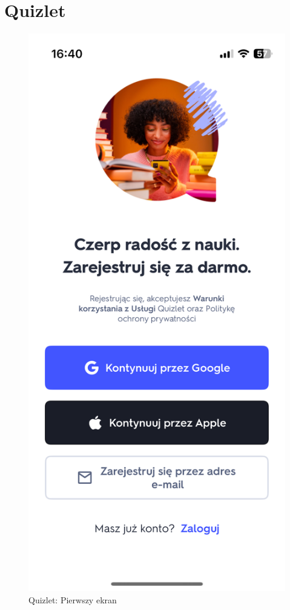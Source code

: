 \documentclass[final,a4paper,openany,12pt]{mwbk}
\begin{document}
\section{Quizlet} 

\begin{figure}[H]
\centering
\begin{minipage}{0.5\textwidth}
  \centering
\includegraphics[width=.75\linewidth]{img/quizlet1.PNG}
  \caption{Quizlet: Pierwszy ekran}
  \label{fig:quizlet1}
\end{minipage}%
\begin{minipage}{0.5\textwidth}
  \centering

\end{minipage}
\end{figure}
\end{document}
